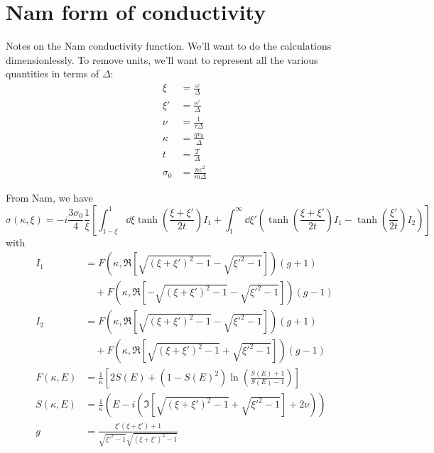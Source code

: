 \documentclass[11pt]{article}
\begin{document}
\graphicspath{{figures/}}

\section{Nam form of conductivity} \label{sec:NamForm}

Notes on the Nam conductivity function.\supercite{Nam1967}
We'll want to do the calculations dimensionlessly.
To remove units, we'll want to represent all the various quantities in terms of $\Delta$:
\begin{align}
	\xi &= \frac{\omega}{\Delta} \\
	\xi' &= \frac{\omega'}{\Delta} \\
	\nu &= \frac{1}{\tau \Delta} \\
	\kappa &= \frac{q v_0}{\Delta} \\
	t &= \frac{T}{\Delta} \\
	\sigma_0 &= \frac{n e^2}{m \Delta}
\end{align}

From Nam, we have
\begin{equation}
	\sigma(\kappa, \xi) = -i \frac{3 \sigma_0}{4} \frac{1}{\xi}\left[\int_{1 - \xi}^{1}\dd{\xi} \tanh(\frac{\xi + \xi'}{2 t}) I_1 + \int_{1}^{\infty} \dd{\xi'} \left( \tanh(\frac{\xi + \xi'}{2t}) I_1  - \tanh(\frac{\xi'}{2t})I_2 \right) \right]
\end{equation}
with
\begin{align}
	I_1 &= F(\kappa, \Re[\sqrt{(\xi + \xi')^2 - 1} - \sqrt{\xi'^2 - 1}]) (g + 1) \nonumber\\
	&\quad + F(\kappa, \Re[-\sqrt{(\xi + \xi')^2 - 1} - \sqrt{\xi'^2 - 1}]) (g - 1) \\
	I_2 &= F(\kappa, \Re[\sqrt{(\xi + \xi')^2 - 1} - \sqrt{\xi'^2 - 1}]) (g + 1) \nonumber\\
	&\quad + F(\kappa, \Re[\sqrt{(\xi + \xi')^2 - 1} + \sqrt{\xi'^2 - 1}]) (g - 1) \\
	F(\kappa, E) &= \frac{1}{\kappa} \left[2 S(E) + (1 - S(E)^2)\ln(\frac{S(E) + 1}{S(E) - 1})\right]  \\
	S(\kappa, E) &= \frac{1}{\kappa} \left(E - i \left(\Im[\sqrt{(\xi + \xi')^2 - 1} + \sqrt{\xi'^2 - 1}] + 2 \nu \right) \right) \\
	g  &= \frac{\xi' \left( \xi + \xi'\right) + 1}{\sqrt{\xi'^2 - 1}\sqrt{(\xi + \xi')^2 - 1}}
\end{align}
\end{document}
